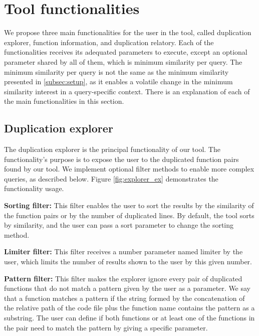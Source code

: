 \en

\section{Tool functionalities}
\label{subsec:func}

We propose three main functionalities for the user in the tool, called duplication explorer,
function information, and duplication relatory. Each of the functionalities receives its 
adequated parameters to execute, except an optional parameter shared by all of them, which 
is minimum similarity per query. The minimum similarity per query is not the same as the 
minimum similarity presented in \ref{subsec:setup}, as it enables a volatile change in the minimum 
similarity interest in a query-specific context. There is an explanation of each of the 
main functionalities in this section.

\subsection{Duplication explorer}

The duplication explorer is the principal functionality of our tool. The functionality's
purpose is to expose the user to the duplicated function pairs found by our tool. We 
implement optional filter methods to enable more complex queries, as described below. 
Figure \ref{fig:explorer_ex} demonstrates the functionality usage.

\begin{itemize}
	\begin{item}
		\textbf{Sorting filter:} This filter enables the user to sort the results by the 
		similarity of the function pairs or by the number of duplicated lines. By default, 
		the tool sorts by similarity, and the user can pass a sort parameter to change 
		the sorting method.
	\end{item}

	\begin{item}
		\textbf{Limiter filter:} This filter receives a number parameter named limiter 
		by the user, which limits the number of results shown to the user by this given number.
	\end{item}

	\begin{item}
		\textbf{Pattern filter:} This filter makes the explorer ignore every pair 
		of duplicated functions that do not match a pattern given by the user as a parameter.
		We say that a function matches a pattern if the string formed by the concatenation 
		of the relative path of the code file plus the function name contains the pattern 
		as a substring. The user can define if both functions or at least one of the 
		functions in the pair need to match the pattern by giving a specific parameter.
	\end{item}
\end{itemize}

